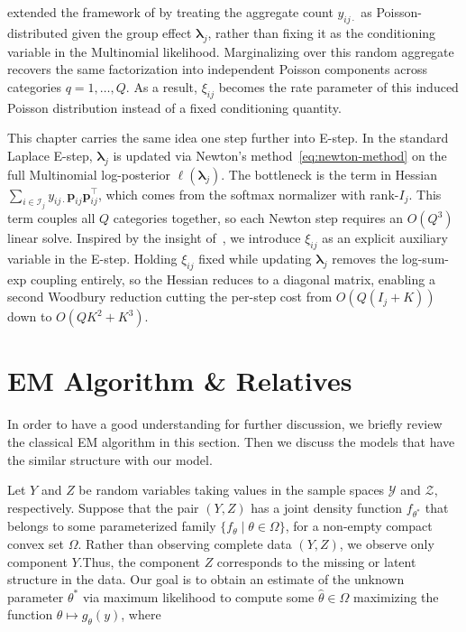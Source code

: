\citet{lee2017poissontrickextensionsfitting} extended the framework of \citet{10.2307/2348134} by treating the aggregate count $y_{ij\cdot}$ as Poisson-distributed given the group effect $\bm{\lambda}_{j}$, rather than fixing it as the conditioning variable in the Multinomial likelihood. Marginalizing over this random aggregate recovers the same factorization into independent Poisson components across categories $q = 1, \dots, Q$. As a result, $\xi_{ij}$ becomes the rate parameter of this induced Poisson distribution instead of a fixed conditioning quantity.

This chapter carries the same idea one step further into E-step. In the standard Laplace E-step, $\bm{\lambda}_j$ is updated via Newton's method~\eqref{eq:newton-method} on the full Multinomial log-posterior $\ell(\bm{\lambda}_j)$. The bottleneck is the term in Hessian $\sum_{i \in \mathcal{I}_j} y_{ij\cdot} \bm{p}_{ij} \bm{p}_{ij}^\top$, which comes from the softmax normalizer with rank-$I_j$. This term couples all $Q$ categories together, so each Newton step requires an $O(Q^3)$ linear solve. Inspired by the insight of~\citet{lee2017poissontrickextensionsfitting}, we introduce $\xi_{ij}$ as an explicit auxiliary variable in the E-step. Holding $\xi_{ij}$ fixed while updating $\bm{\lambda}_j$ removes the log-sum-exp coupling entirely, so the Hessian reduces to a diagonal matrix, enabling a second Woodbury reduction cutting the per-step cost from $O(Q(I_j + K))$ down to $O(QK^2 + K^3)$. 

\section{EM Algorithm \& Relatives}
\label{sec: em-algorithm-relatives}

In order to have a good understanding for further discussion, we briefly review the classical EM algorithm in this section. Then we discuss the models that have the similar structure with our model. 

Let $Y$ and $Z$ be random variables taking values in the sample spaces $\mathcal{Y}$ and $\mathcal{Z}$, respectively. Suppose that the pair $(Y,Z)$ has a joint density function $f_{\theta^{*}}$ that belongs to some parameterized family $\{f_{\theta}\mid \theta\in \Omega
\}$, for a non-empty compact convex set $\Omega$. Rather than observing complete data $(Y,Z)$, we observe only component $Y$.Thus, the component $Z$ corresponds to the missing or latent structure in the data. Our goal is to obtain an estimate of the unknown parameter $\theta^{*}$ via maximum likelihood to compute some $\hat{\theta}\in\Omega$ maximizing the function $\theta\mapsto g_{\theta}(y)$, where

